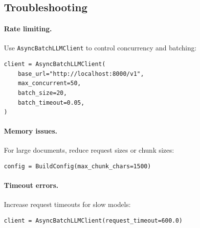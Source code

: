 \subsection{Troubleshooting}

\paragraph{Rate limiting.}
Use \texttt{AsyncBatchLLMClient} to control concurrency and batching:
\begin{lstlisting}
client = AsyncBatchLLMClient(
    base_url="http://localhost:8000/v1",
    max_concurrent=50,
    batch_size=20,
    batch_timeout=0.05,
)
\end{lstlisting}

\paragraph{Memory issues.}
For large documents, reduce request sizes or chunk sizes:
\begin{lstlisting}
config = BuildConfig(max_chunk_chars=1500)
\end{lstlisting}

\paragraph{Timeout errors.}
Increase request timeouts for slow models:
\begin{lstlisting}
client = AsyncBatchLLMClient(request_timeout=600.0)
\end{lstlisting}
